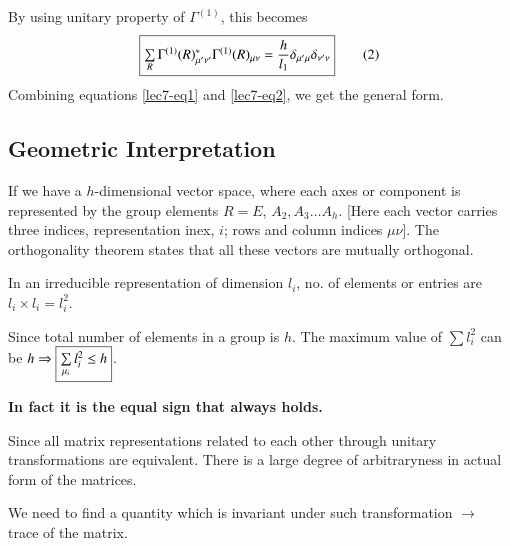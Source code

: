 \chapter{}\label{lec7}

By using unitary property of $\Gamma^{(1)}$, this becomes
\begin{equation*}
\fbox{$\sum\limits_{R}\Gamma^{(1)}(R)^{*}_{\mu'\nu'}\Gamma^{(1)}(R)_{\mu\nu}=\dfrac{h}{l_{1}}\delta_{\mu'\mu}\delta_{\nu'\nu}$}\tag{2}\label{lec7-eq2}
\end{equation*}
Combining equations \eqref{lec7-eq1} and \eqref{lec7-eq2}, we get the general form.

\section*{Geometric Interpretation}

If we have a $h$-dimensional vector space, where each axes or component is represented by the group elements $R=E$, $A_{2},A_{3}\ldots A_{h}$. [Here each vector carries three indices, representation inex, $i$; rows and column indices $\mu\nu$]. The orthogonality theorem states that all these vectors are mutually orthogonal.

In an irreducible representation of dimension $l_{i}$, no. of elements or entries are $l_{i}\times l_{i}=l_{i}^{2}$.

Since total number of elements in a group is $h$. The maximum value of $\sum l^{2}_{i}$ can be $h \Rightarrow \fbox{$\sum\limits_{\mu_{i}}l^{2}_{i}\leq h$}$.

{\bf In fact it is the equal sign that always holds.}

Since all matrix representations related to each other through unitary transformations are equivalent. There is a large degree of arbitraryness in actual form of the matrices.

We need to find a quantity which is invariant under such transformation $\to$ trace of the matrix.

